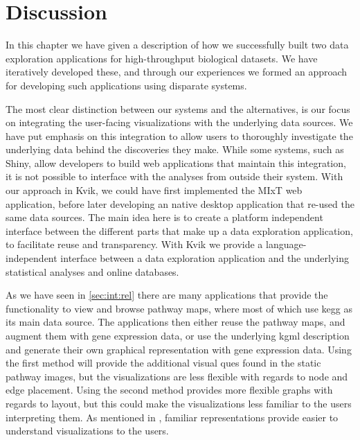\section{Discussion}
In this chapter we have given a description of how we successfully built two
data exploration applications for high-throughput biological datasets. We have
iteratively developed these, and through our experiences we formed
an approach for developing such applications using disparate systems. 

The most clear distinction between our systems and the alternatives, is our
focus on integrating the user-facing visualizations with the underlying data
sources. We have put emphasis on this integration to allow users to thoroughly
investigate the underlying data behind the discoveries they make.  While some
systems, such as Shiny, allow developers to build web applications that maintain
this integration, it is not possible to interface with the analyses from outside
their system. With our approach in Kvik, we could have first implemented the
MIxT web application, before later developing an native desktop application that
re-used the same data sources. The main idea here is to create a platform
independent interface between the different parts that make up a data
exploration application, to facilitate reuse and transparency. With Kvik we
provide a language-independent interface between a data exploration application
and the underlying statistical analyses and online
databases. 

As we have seen in \ref{sec:int:rel} there are many applications that provide
the functionality to view and browse pathway maps, where most of which
use \gls{kegg} as its main data source. The applications then either reuse
the pathway maps, and augment them with gene expression data, or use the
underlying \gls{kgml} description and generate their own graphical
representation with gene expression data. Using the first method will provide
the additional visual ques found in the static pathway images, but the
visualizations are less flexible with regards to node and edge placement. Using
the second method provides more flexible graphs with regards to layout, but this
could make the visualizations less familiar to the users interpreting them. As
mentioned in \cite{o2018visualization}, familiar representations provide easier
to understand visualizations to the users. 

